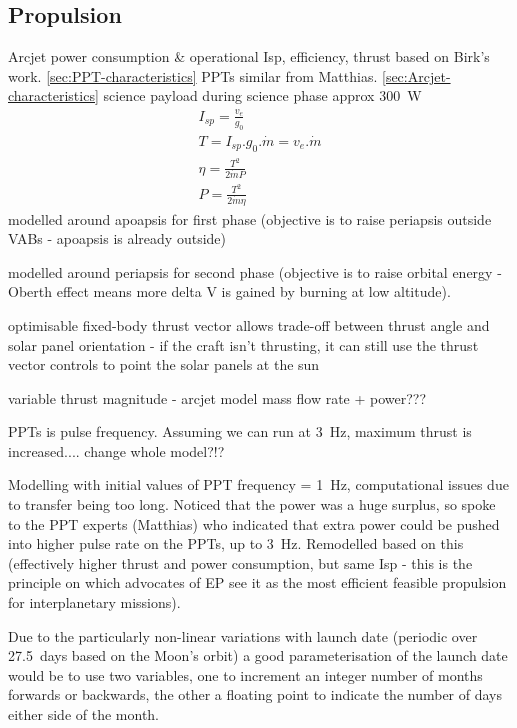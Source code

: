 \subsection{Propulsion}
Arcjet power consumption \& operational Isp, efficiency, thrust based on Birk's work. \autoref{sec:PPT-characteristics}
PPTs similar from Matthias. \autoref{sec:Arcjet-characteristics}
science payload during science phase approx 300~W \parencite{web_BW-1}
\begin{gather}
I_{sp} = \frac{v_e}{g_0} \\
T = I_{sp}.g_0.\dot{m} = v_e.\dot{m} \\
\eta = \frac{T^2}{2\dot{m}P} \\
P = \frac{T^2}{2\dot{m}\eta} 
\end{gather}
modelled around apoapsis for first phase (objective is to raise periapsis outside VABs - apoapsis is already outside)

modelled around periapsis for second phase (objective is to raise orbital energy - Oberth effect means more delta V is gained by burning at low altitude).

optimisable fixed-body thrust vector allows trade-off between thrust angle and solar panel orientation - if the craft isn't thrusting, it can still use the thrust vector controls to point the solar panels at the sun

variable thrust magnitude - arcjet model mass flow rate + power???

PPTs is pulse frequency. Assuming we can run at 3~Hz, maximum thrust is increased.... change whole model?!?

Modelling with initial values of PPT frequency = 1~Hz, computational issues due to transfer being too long. Noticed that the power was a huge surplus, so spoke to the PPT experts (Matthias) who indicated that extra power could be pushed into higher pulse rate on the PPTs, up to 3~Hz. Remodelled based on this (effectively higher thrust and power consumption, but same Isp - this is the principle on which advocates of EP see it as the most efficient feasible propulsion for interplanetary missions).

Due to the particularly non-linear variations with launch date (periodic over 27.5~days based on the Moon's orbit) a good parameterisation of the launch date would be to use two variables, one to increment an integer number of months forwards or backwards, the other a floating point to indicate the number of days either side of the month.

